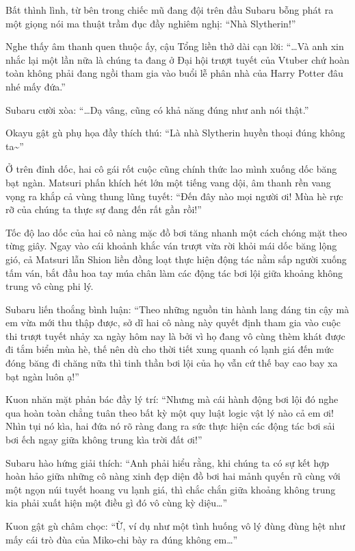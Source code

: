 \documentclass[../main.tex]{subfiles}
\begin{document}
Bất thình lình, từ bên trong chiếc mũ đang đội trên đầu Subaru bỗng phát ra một giọng nói ma thuật trầm đục đầy nghiêm nghị: ``Nhà Slytherin!''

Nghe thấy âm thanh quen thuộc ấy, cậu Tổng liền thở dài cạn lời: ``\dots Và anh xin nhắc lại một lần nữa là chúng ta đang ở Đại hội trượt tuyết của Vtuber chứ hoàn toàn không phải đang ngồi tham gia vào buổi lễ phân nhà của Harry Potter đâu nhé mấy đứa.''

Subaru cười xòa: ``\dots Dạ vâng, cũng có khả năng đúng như anh nói thật.''

Okayu gật gù phụ họa đầy thích thú: ``Là nhà Slytherin huyền thoại đúng không ta\~{}''

Ở trên đỉnh dốc, hai cô gái rốt cuộc cũng chính thức lao mình xuống dốc băng bạt ngàn. Matsuri phấn khích hét lớn một tiếng vang dội, âm thanh rền vang vọng ra khắp cả vùng thung lũng tuyết: ``Đến đây nào mọi người ơi! Mùa hè rực rỡ của chúng ta thực sự đang đến rất gần rồi!''

Tốc độ lao dốc của hai cô nàng mặc đồ bơi tăng nhanh một cách chóng mặt theo từng giây. Ngay vào cái khoảnh khắc ván trượt vừa rời khỏi mái dốc băng lộng gió, cả Matsuri lẫn Shion liền đồng loạt thực hiện động tác nằm sấp người xuống tấm ván, bắt đầu hoa tay múa chân làm các động tác bơi lội giữa khoảng không trung vô cùng phi lý.

Subaru liến thoắng bình luận: ``Theo những nguồn tin hành lang đáng tin cậy mà em vừa mới thu thập được, sở dĩ hai cô nàng này quyết định tham gia vào cuộc thi trượt tuyết nhảy xa ngày hôm nay là bởi vì họ đang vô cùng thèm khát được đi tắm biển mùa hè, thế nên dù cho thời tiết xung quanh có lạnh giá đến mức đóng băng đi chăng nữa thì tinh thần bơi lội của họ vẫn cứ thế bay cao bay xa bạt ngàn luôn ạ!''

Kuon nhăn mặt phản bác đầy lý trí: ``Nhưng mà cái hành động bơi lội đó nghe qua hoàn toàn chẳng tuân theo bất kỳ một quy luật logic vật lý nào cả em ơi! Nhìn tụi nó kìa, hai đứa nó rõ ràng đang ra sức thực hiện các động tác bơi sải bơi ếch ngay giữa không trung kìa trời đất ơi!''

Subaru hào hứng giải thích: ``Anh phải hiểu rằng, khi chúng ta có sự kết hợp hoàn hảo giữa những cô nàng xinh đẹp diện đồ bơi hai mảnh quyến rũ cùng với một ngọn núi tuyết hoang vu lạnh giá, thì chắc chắn giữa khoảng không trung kia phải xuất hiện một điều gì đó vô cùng kỳ diệu\dots''

Kuon gật gù châm chọc: ``Ừ, ví dụ như một tình huống vô lý đùng đùng hệt như mấy cái trò đùa của Miko-chi bày ra đúng không em\dots''
\end{document}
